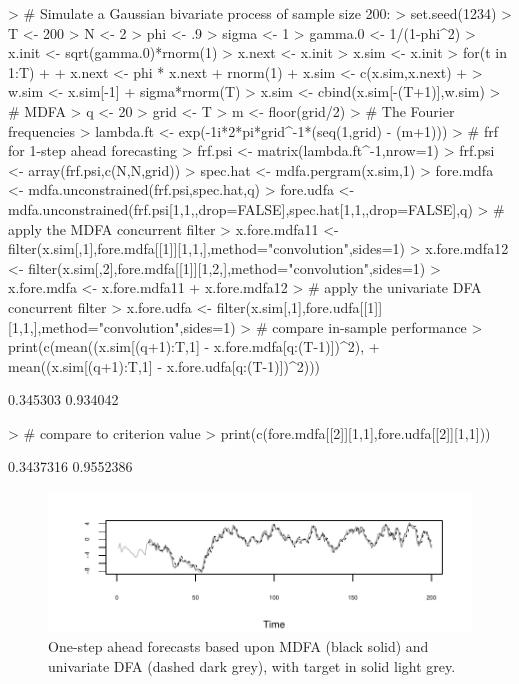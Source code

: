 \documentclass[a4paper]{book}
\begin{document}
\begin{Schunk}
\begin{Sinput}
> # Simulate a Gaussian bivariate process of sample size 200:
> set.seed(1234)
> T <- 200
> N <- 2
> phi <- .9
> sigma <- 1
> gamma.0 <- 1/(1-phi^2)
> x.init <- sqrt(gamma.0)*rnorm(1)
> x.next <- x.init
> x.sim <- x.init
> for(t in 1:T)
+ {
+ 	x.next <- phi * x.next + rnorm(1)
+ 	x.sim <- c(x.sim,x.next)
+ }
> w.sim <- x.sim[-1] + sigma*rnorm(T)
> x.sim <- cbind(x.sim[-(T+1)],w.sim)
> # MDFA
> q <- 20
> grid <- T
> m <- floor(grid/2)
> # The Fourier frequencies
> lambda.ft <- exp(-1i*2*pi*grid^{-1}*(seq(1,grid) - (m+1)))
> # frf for 1-step ahead forecasting
> frf.psi <- matrix(lambda.ft^{-1},nrow=1) %
> frf.psi <- array(frf.psi,c(N,N,grid))
> spec.hat <- mdfa.pergram(x.sim,1)	
> fore.mdfa <- mdfa.unconstrained(frf.psi,spec.hat,q)
> fore.udfa <- mdfa.unconstrained(frf.psi[1,1,,drop=FALSE],spec.hat[1,1,,drop=FALSE],q)
> # apply the MDFA concurrent filter
> x.fore.mdfa11 <- filter(x.sim[,1],fore.mdfa[[1]][1,1,],method="convolution",sides=1)
> x.fore.mdfa12 <- filter(x.sim[,2],fore.mdfa[[1]][1,2,],method="convolution",sides=1)
> x.fore.mdfa <- x.fore.mdfa11 + x.fore.mdfa12 
> # apply the univariate DFA concurrent filter
> x.fore.udfa <- filter(x.sim[,1],fore.udfa[[1]][1,1,],method="convolution",sides=1)
> # compare in-sample performance
> print(c(mean((x.sim[(q+1):T,1] - x.fore.mdfa[q:(T-1)])^2),
+ 	mean((x.sim[(q+1):T,1] - x.fore.udfa[q:(T-1)])^2)))
\end{Sinput}
\begin{Soutput}
[1] 0.345303 0.934042
\end{Soutput}
\begin{Sinput}
> # compare to criterion value
> print(c(fore.mdfa[[2]][1,1],fore.udfa[[2]][1,1]))
\end{Sinput}
\begin{Soutput}
[1] 0.3437316 0.9552386
\end{Soutput}
\end{Schunk}

 

\begin{figure}[htb!]
\begin{center}
\includegraphics[]{mdfa_bimdfa-udfa.pdf}
\caption{One-step ahead forecasts
 based upon MDFA (black solid) and univariate DFA (dashed dark grey), 
 with target in solid light grey.}
\label{fig:easing1}
\end{center}
\end{figure} 
  
\end{document}
